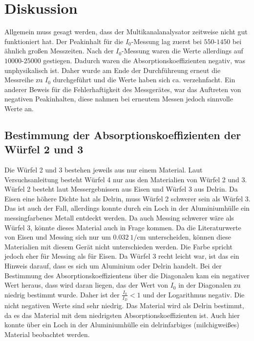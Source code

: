 \section{Diskussion}
\label{sec:Diskussion}

Allgemein muss gesagt werden, dass der Multikanalanalysator zeitweise nicht gut funktioniert hat. 
Der Peakinhalt für die $I_0$-Messung lag zuerst bei $\num{550}$-$\num{1450}$ bei ähnlich großen Messzeiten. Nach der $I_0$-Messung 
waren die Werte allerdings auf $\num{10000}$-$\num{25000}$ gestiegen. Dadurch waren die Absorptionskoeffizienten negativ, was unphysikalisch ist.
Daher wurde am Ende der Durchführeung erneut die Messreihe zu $I_0$ durchgeführt und die Werte haben sich ca. verzehnfacht. Ein anderer Beweis für 
die Fehlerhaftigkeit des Messgerätes, war das Auftreten von negativen Peakinhalten, diese nahmen bei erneutem Messen jedoch 
sinnvolle Werte an.

\subsection{Bestimmung der Absorptionskoeffizienten der Würfel 2 und 3}

Die Würfel 2 und 3 bestehen jeweils aus nur einem Material. Laut Versuchsanleitung besteht Würfel 4 nur aus den 
Materialien von Würfel 2 und 3. Würfel 2 besteht laut Messergebnissen aus Eisen und Würfel 3 aus Delrin. Da Eisen eine 
höhere Dichte hat als Delrin, muss Würfel 2 schwerer sein als Würfel 3. Das ist auch der Fall, allerdings konnte durch 
ein Loch in der Aluminiumhülle ein messingfarbenes Metall entdeckt werden. Da auch Messing schwerer wäre als Würfel 
3, könnte dieses Material auch in Frage kommen. Da die Literaturwerte von Eisen und Messing sich nur um $\SI{0.032}{1\per\centi\meter}$
unterscheiden, können diese Materialien mit diesem Gerät nicht unterschieden werden. Die Farbe spricht jedoch eher für Messing als für Eisen.
Da Würfel 3 recht leicht war, ist das ein Hinweis darauf, dass es sich um Aluminium oder Delrin handelt. 
Bei der Bestimmung des Absorptionskoeffizientens über die Diagonalen kam ein negativer Wert heraus, dass 
wird daran liegen, das der Wert von $I_0$ in der Diagonalen zu niedrig bestimmt wurde. Daher ist der $\frac{I_0}{I_{D}}<1$ und 
der Logarithmus negativ. Die nicht negativen Werte sind sehr niedrig. Das Material wird als Delrin bestimmt, da es das Material
mit dem niedrigsten Absorptionskoeffizienten ist. Auch hier konnte über ein Loch in der Aluminiumhülle 
ein delrinfarbiges (milchigweißes) Material beobachtet werden.

